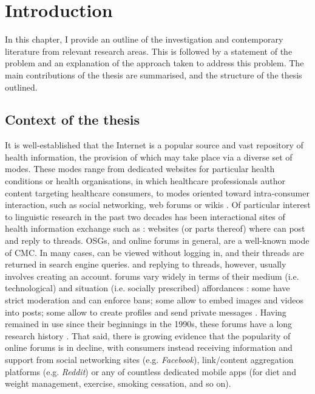 

\chapter{Introduction} \label{chap:intro}

In this chapter, I provide an outline of the investigation and contemporary literature from relevant research areas. This is followed by a statement of the problem and an explanation of the approach taken to address this problem. The main contributions of the thesis are summarised, and the structure of the thesis outlined.

\section{Context of the thesis}

It is well\hyp{}established that the Internet is a popular source and vast repository of health information, the provision of which may take place via a diverse set of \glspl{mode}. These \glspl{mode} range from dedicated websites for particular health conditions or health organisations, in which healthcare professionals author content targeting healthcare \glspl{consumer}, to \glspl{mode} oriented toward intra\hyp{}consumer interaction, such as social networking, web \glspl{forum} or wikis \cite{sillence_why_2013}. Of particular interest to linguistic research in the past two decades has been interactional sites of health information exchange such as : websites (or parts thereof) where  can \gls{post} and reply to \glspl{thread}. \glspl{OSG}, and online \glspl{forum} in general, are a well\hyp{}known \gls{mode} of \gls{CMC}. In many cases,  can be viewed without logging in, and their \glspl{thread} are returned in search engine queries.  and replying to \glspl{thread}, however, usually involves creating an account. \Glspl{forum} vary widely in terms of their medium (i.e. technological) and situation (i.e. socially prescribed) affordances \cite{herring_faceted_2007}: some have strict moderation and can enforce bans; some allow  to embed images and videos into \glspl{post}; some allow  to create profiles and send private messages \cite{morzy_analysis_2012}. Having remained in use since their beginnings in the 1990s, these \glspl{forum} have a long research history \cite[e.g.][]{sharf_communicating_1997}. That said, there is growing evidence that the popularity of online \glspl{forum} is in decline, with consumers instead receiving information and support from social networking sites (e.g. \emph{Facebook}), link\slash content aggregation platforms (e.g. \emph{Reddit}) or any of countless dedicated mobile apps (for diet and weight management, exercise, smoking cessation, and so on).

